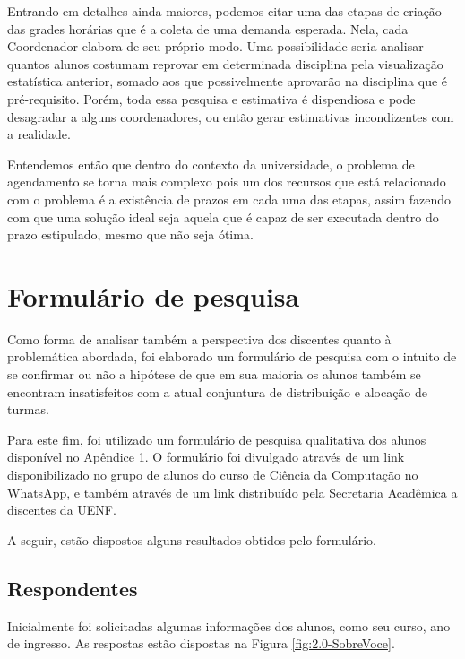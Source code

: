     Entrando em detalhes ainda maiores, podemos citar uma das etapas de criação das grades horárias que é a coleta de uma demanda esperada. Nela, cada Coordenador elabora de seu próprio modo. Uma possibilidade seria analisar quantos alunos costumam reprovar em determinada disciplina pela visualização estatística anterior, somado aos que possivelmente aprovarão na disciplina que é pré-requisito. Porém, toda essa pesquisa e estimativa é dispendiosa e pode desagradar a alguns coordenadores, ou então gerar estimativas incondizentes com a realidade.

    Entendemos então que dentro do contexto da universidade, o problema de agendamento se torna mais complexo pois um dos recursos que está relacionado com o problema é a existência de prazos em cada uma das etapas, assim fazendo com que uma solução ideal seja aquela que é capaz de ser executada dentro do prazo estipulado, mesmo que não seja ótima.

\section{Formulário de pesquisa} %


    Como forma de analisar também a perspectiva dos discentes quanto à problemática abordada, foi elaborado um formulário de pesquisa com o intuito de se confirmar ou não a hipótese de que em sua maioria os alunos também se encontram insatisfeitos com a atual conjuntura de distribuição e alocação de turmas.

    Para este fim, foi utilizado um formulário de pesquisa qualitativa dos alunos disponível no Apêndice 1. O formulário foi divulgado através de um link disponibilizado no grupo de alunos do curso de Ciência da Computação no WhatsApp, e também através de um link distribuído pela Secretaria Acadêmica a discentes da UENF.

    A seguir, estão dispostos alguns resultados obtidos pelo formulário.

    \subsection{Respondentes} %

        Inicialmente foi solicitadas algumas informações dos alunos, como seu curso, ano de ingresso. As respostas estão dispostas na Figura \ref{fig:2.0-SobreVoce}.

